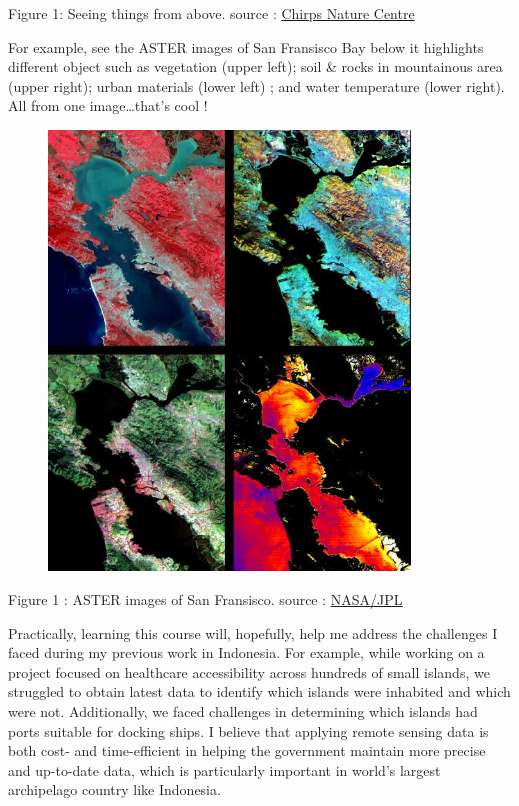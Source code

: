 \documentclass[
  letterpaper,
  DIV=11,
  numbers=noendperiod]{scrreprt}
\begin{document}
Figure 1: Seeing things from above. source :
\href{https://chirpforbirds.com/nature-advocacy/biomimicry-and-birds/}{Chirps
Nature Centre}

For example, see the ASTER images of San Fransisco Bay below it
highlights different object such as vegetation (upper left); soil \&
rocks in mountainous area (upper right); urban materials (lower left) ;
and water temperature (lower right). All from one image\ldots that's
cool !

\begin{figure}

\href{https://photojournal.jpl.nasa.gov/jpegMod/PIA02605_modest.jpg}{\includegraphics[width=3.78125in,height=\textheight]{images/PIA02605_modest.jpg}}

\end{figure}

Figure 1 : ASTER images of San Fransisco. source :
\href{https://photojournal.jpl.nasa.gov/catalog/PIA02605}{NASA/JPL}

Practically, learning this course will, hopefully, help me address the
challenges I faced during my previous work in Indonesia. For example,
while working on a project focused on healthcare accessibility across
hundreds of small islands, we struggled to obtain latest data to
identify which islands were inhabited and which were not. Additionally,
we faced challenges in determining which islands had ports suitable for
docking ships. I believe that applying remote sensing data is both cost-
and time-efficient in helping the government maintain more precise and
up-to-date data, which is particularly important in world's largest
archipelago country like Indonesia.
\end{document}
